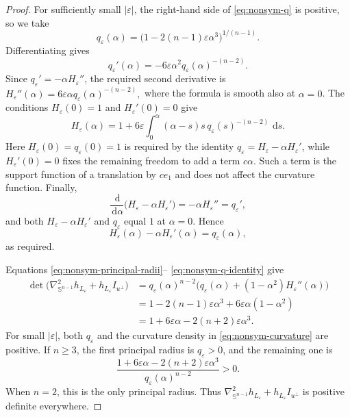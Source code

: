 \documentclass[11pt]{article}
\theoremstyle{remark}
\newcommand{\Sph}{\mathbb{S}}
\newcommand{\dd}{\,\mathrm{d}}
\begin{document}
\begin{proof}
For sufficiently small $|\varepsilon|$, the right-hand side of
\eqref{eq:nonsym-q} is positive, so we take
\[
 q_\varepsilon(\alpha)
 =\bigl(1-2(n-1)\varepsilon\alpha^3\bigr)^{1/(n-1)}.
\]
Differentiating gives
\[
 q_\varepsilon'(\alpha)
 =-6\varepsilon\alpha^2q_\varepsilon(\alpha)^{-(n-2)}.
\]
Since $q_\varepsilon'=-\alpha H_\varepsilon''$, the required second
derivative is
$
 H_\varepsilon''(\alpha)
 =6\varepsilon\alpha q_\varepsilon(\alpha)^{-(n-2)},
$
where the formula is smooth also at $\alpha=0$.  The conditions
$H_\varepsilon(0)=1$ and $H_\varepsilon'(0)=0$ give
\begin{equation}\label{eq:nonsym-H}
 H_\varepsilon(\alpha)
 =1+6\varepsilon\int_0^\alpha
       (\alpha-s)s\,q_\varepsilon(s)^{-(n-2)}\,\dd s.
\end{equation}
Here $H_\varepsilon(0)=q_\varepsilon(0)=1$ is required by the identity
$q_\varepsilon=H_\varepsilon-\alpha H_\varepsilon'$, while
$H_\varepsilon'(0)=0$ fixes the remaining freedom to add a term
$c\alpha$.  Such a term is the support function of a translation by
$ce_1$ and does not affect the curvature function.  Finally,
\[
 \frac{\dd}{\dd\alpha}
 \bigl(H_\varepsilon-\alpha H_\varepsilon'\bigr)
 =-\alpha H_\varepsilon''=q_\varepsilon',
\]
and both $H_\varepsilon-\alpha H_\varepsilon'$ and $q_\varepsilon$ equal
$1$ at $\alpha=0$.  Hence
\begin{equation}\label{eq:nonsym-q-identity}
 H_\varepsilon(\alpha)-\alpha H_\varepsilon'(\alpha)
 =q_\varepsilon(\alpha),
\end{equation}
as required.

Equations \eqref{eq:nonsym-principal-radii}--
\eqref{eq:nonsym-q-identity} give
\begin{align*}
 \det\bigl(\nabla_{\Sph^{n-1}}^2h_{L_\varepsilon}
              +h_{L_\varepsilon} I_{u^\perp}\bigr)
 &=q_\varepsilon(\alpha)^{n-2}
   \bigl(q_\varepsilon(\alpha)
         +(1-\alpha^2)H_\varepsilon''(\alpha)\bigr)\\
 &=1-2(n-1)\varepsilon\alpha^3
   +6\varepsilon\alpha(1-\alpha^2)\\
 &=1+6\varepsilon\alpha-2(n+2)\varepsilon\alpha^3.
\end{align*}
For small $|\varepsilon|$, both $q_\varepsilon$ and the curvature density
in \eqref{eq:nonsym-curvature} are positive.  If $n\geq3$, the first
principal radius is $q_\varepsilon>0$, and the remaining one is
\[
 \frac{1+6\varepsilon\alpha-2(n+2)\varepsilon\alpha^3}
      {q_\varepsilon(\alpha)^{n-2}}>0.
\]
When $n=2$, this is the only principal radius.  Thus
$\nabla_{\Sph^{n-1}}^2h_{L_\varepsilon}
 +h_{L_\varepsilon}I_{u^\perp}$ is positive definite everywhere.


\end{proof}
\end{document}
